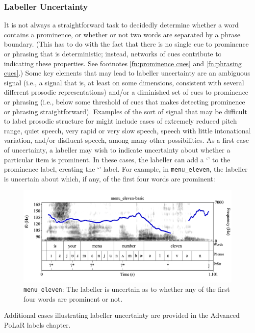 \documentclass[11pt, twoside]{memoir}
\def\textlabel#1{{\relsize{-.5}\fontspec[Mapping=tex-text]{Roboto Mono}{#1}}}
\begin{document}
\subsubsection{Labeller Uncertainty}\label{sec:labeller-uncertainty}
It is not always a straightforward task to decidedly determine whether a word contains a prominence, or whether or not two words are separated by a phrase boundary. (This has to do with the fact that there is no single cue to prominence or phrasing that is deterministic; instead, networks of cues contribute to indicating these properties. See footnotes \ref{fn:prominence cues} and \ref{fn:phrasing cues}.) Some key elements that may lead to labeller uncertainty are an ambiguous signal (i.e., a signal that is, at least on some dimensions, consistent with several different prosodic representations) and/or a diminished set of cues to prominence or phrasing (i.e., below some threshold of cues that makes detecting prominence or phrasing straightforward). Examples of the sort of signal that may be difficult to label prosodic structure for might include cases of extremely reduced pitch range, quiet speech, very rapid or very slow speech, speech with little intonational variation, and/or disfluent speech, among many other possibilities.
As a first case of uncertainty, a labeller may wish to indicate uncertainty about whether a particular item is prominent. In these cases, the labeller can add a ‘\textlabel{?}’ to the prominence label, creating the ‘\textlabel{?*}’ label. For example, in \texttt{menu\_eleven}, the labeller is uncertain about which, if any, of the first four words are prominent:
\begin{figure}[H]
\centering
\includegraphics[width=.875\linewidth]{PrStr-menu_eleven-basic.png}
\caption{\texttt{menu\_eleven}: The labeller is uncertain as to whether any of the first four words are prominent or not.
\label{fig:menu eleven PrStr uncertainty}
}
\end{figure}
Additional cases illustrating labeller uncertainty are provided in the Advanced PoLaR labels chapter.
\end{document}
